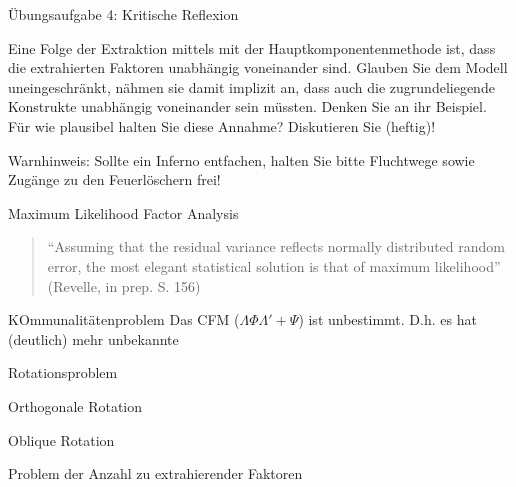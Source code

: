 \documentclass[
  ignorenonframetext,
]{beamer}
\begin{document}
\begin{frame}{Übungsaufgabe 4: Kritische Reflexion}
\protect\hypertarget{uxfcbungsaufgabe-4-kritische-reflexion}{}
\begin{example}
Eine Folge der Extraktion mittels mit der Hauptkomponentenmethode ist, dass die
extrahierten Faktoren unabhängig voneinander sind. Glauben Sie dem Modell
uneingeschränkt, nähmen sie damit implizit an, dass auch die zugrundeliegende
Konstrukte unabhängig voneinander sein müssten. Denken Sie an ihr Beispiel. Für
wie plausibel halten Sie diese Annahme? Diskutieren Sie (heftig)! 
\end{example}

Warnhinweis: Sollte ein Inferno entfachen, halten Sie bitte Fluchtwege
sowie Zugänge zu den Feuerlöschern frei!
\end{frame}

\begin{frame}{Maximum Likelihood Factor Analysis}
\protect\hypertarget{maximum-likelihood-factor-analysis}{}
\begin{quote}
``Assuming that the residual variance reflects normally distributed
random error, the most elegant statistical solution is that of maximum
likelihood'' (Revelle, in prep. S. 156)
\end{quote}

\begin{alertblock}{KOmmunalitätenproblem}
Das CFM ($\Lambda \Phi \Lambda' + \Psi$) ist unbestimmt. D.h. es hat (deutlich)
mehr unbekannte 

\end{alertblock}
\end{frame}

\begin{frame}{Rotationsproblem}
\protect\hypertarget{rotationsproblem}{}
\end{frame}

\begin{frame}{Orthogonale Rotation}
\protect\hypertarget{orthogonale-rotation}{}
\end{frame}

\begin{frame}{Oblique Rotation}
\protect\hypertarget{oblique-rotation}{}
\end{frame}

\begin{frame}{Problem der Anzahl zu extrahierender Faktoren}
\protect\hypertarget{problem-der-anzahl-zu-extrahierender-faktoren}{}
\end{frame}
\end{document}
